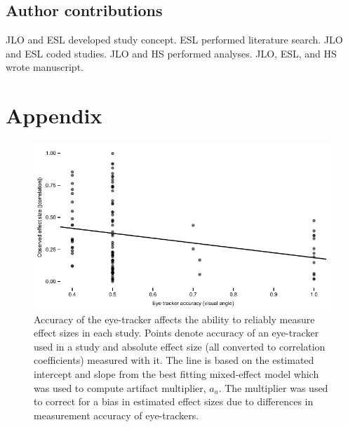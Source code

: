 \documentclass[english,natbib,man,floatsintext]{apa6}
\begin{document}
\subsection{Author contributions}
JLO and ESL developed study concept. ESL performed literature search. JLO and ESL coded studies. JLO and HS performed analyses. JLO, ESL, and HS wrote manuscript. 








\FloatBarrier
\section{Appendix}
\label{appendix}


\begin{figure}
\includegraphics{ET_accuracy_effectsize}
\centering
\caption{Accuracy of the eye-tracker affects the ability to reliably measure effect sizes in each study. Points denote accuracy of an eye-tracker used in a study and absolute effect size (all converted to correlation coefficients) measured with it. The line is based on the estimated intercept and slope from the best fitting mixed-effect model which was used to compute artifact multiplier, $a_a$. The multiplier was used to correct for a bias in estimated effect sizes due to differences in measurement accuracy of eye-trackers.}
\label{fig:ET_accuracy_effectsize}
\end{figure}
\clearpage
\end{document}
